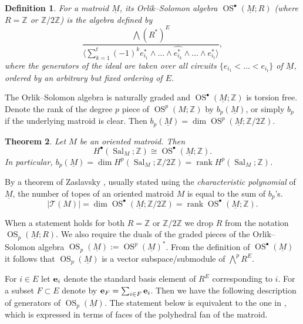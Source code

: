 \documentclass{amsart}
\newtheorem{theorem}{Theorem}[section]
\newtheorem{definition}[theorem]{Definition}
\newcommand\Tcal{{\mathcal T}}
\newcommand\ee{{\bf e}}
\newcommand\ZZ{{\mathbb Z}}
\newcommand\Ztwo{{\mathbb Z}/2{\mathbb Z}}
\DeclareMathOperator{\rank}{rank}
\DeclareMathOperator{\Sal}{Sal}
\DeclareMathOperator{\OS}{OS}
\begin{document}
{\begin{definition}
For a matroid $\underline{M}$, its {\em Orlik--Solomon algebra} $\OS^\bullet(\underline{M}; R)$ (where $R=\ZZ$ or $\Ztwo$) is the algebra defined by \[ \frac{\bigwedge(R^*)^E}{\langle \sum_{k=1}^t (-1)^k e^*_{i_1}\wedge\ldots\wedge\widehat{e^*_{i_k}}\wedge\ldots\wedge e^*_{i_t}\rangle},\] where the generators of the ideal are taken over all circuits $\{e_{i_1}<\ldots<e_{i_t}\}$ of $\underline{M}$, ordered by an arbitrary but fixed ordering of $E$.
\end{definition}

The Orlik--Solomon algebra is naturally graded and $\OS^\bullet(\underline{M}; \ZZ)$ is torsion free. 
Denote the rank of the degree $p$ piece of $\OS^{p}(M; \ZZ)$ by $b_p(\underline{M})$, or simply $b_p$ if the underlying matroid is clear. Then $b_p(\underline{M}) = \dim\OS^p(\underline{M}; \Ztwo)$. 

\begin{theorem} \cite[Section~7]{BZ92} \label{thm:H_eq_OS}
Let $M$ be an oriented matroid.
Then 
$$
H^\bullet(\Sal_M;\ZZ)\cong \OS^\bullet(\underline{M}; \ZZ).
$$
In particular, $b_p(\underline{M})=\dim H^p(\Sal_M;\Ztwo)=\rank H^p(\Sal_M;\ZZ)$.
\end{theorem}

By a theorem of Zaslavsky \cite{GZ83}, usually stated using the {\em characteristic polynomial} of $\underline{M}$, the number of topes of an oriented matroid $M$ is equal to the sum of $b_p$'s.
\begin{equation}\label{Zaslavsky}
|\Tcal(M)| = \dim \OS^\bullet(\underline{M}; \Ztwo)=\rank \OS^\bullet(\underline{M}; \ZZ).
\end{equation}

When a statement holds for both $R = \ZZ$ or $\Ztwo$ we drop $R$ from the notation $\OS_p(\underline{M}; R)$.
We also require the duals of the graded pieces of the Orlik--Solomon algebra $\OS_p(\underline{M}) := \OS^p(\underline{M})^*$. From the definition of $\OS^\bullet(\underline{M})$ it follows that $\OS_p(\underline{M})$ is a vector subspace/submodule of $\bigwedge^p R^E$. 

For $i \in E$ let $\ee_i$ denote the standard basis element of $R^E$ corresponding to $i$.
For a subset $F \subset E$ denote by $\ee_F = \sum_{i \in F} \ee_i$. Then we have the following description of generators of $\OS_p(\underline{M})$. The statement below is equivalent to the one in \cite{Zhar_OS}, which is expressed in terms of faces of the polyhedral fan of the matroid.

}
\end{document}
